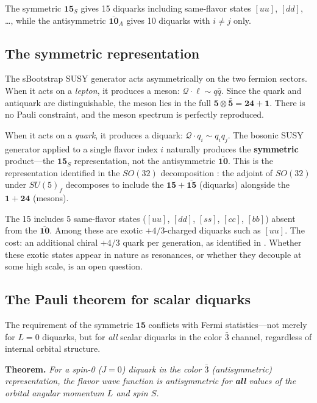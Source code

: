 \documentclass[12pt,a4paper]{article}
\begin{document}
The symmetric $\mathbf{15}_S$ gives 15 diquarks including 
same-flavor states $[uu]$, $[dd]$, \ldots, while the antisymmetric 
$\overline{\mathbf{10}}_A$ gives 10 diquarks with $i \neq j$ only.

\subsection{The symmetric representation}
\label{subsec:sym15}

The sBootstrap SUSY generator acts asymmetrically on the two
fermion sectors. When it acts on a \emph{lepton}, it produces a
meson: $\mathcal{Q} \cdot \ell \sim q\bar{q}$. Since the quark and antiquark 
are distinguishable, the meson lies in the full 
$\mathbf{5} \otimes \bar{\mathbf{5}} = \mathbf{24} + \mathbf{1}$. 
There is no Pauli constraint, and the meson spectrum is perfectly 
reproduced.

When it acts on a \emph{quark}, it produces a diquark:
$\mathcal{Q} \cdot q_i \sim q_i q_j$. The bosonic SUSY generator applied to 
a single flavor index $i$ naturally produces the \textbf{symmetric} 
product---the $\mathbf{15}_S$ representation, not the antisymmetric 
$\overline{\mathbf{10}}$. This is the representation identified 
in the $SO(32)$ decomposition \cite{Rivero2005}: the adjoint of 
$SO(32)$ under $SU(5)_f$ decomposes to include the 
$\mathbf{15} + \overline{\mathbf{15}}$ (diquarks) alongside the 
$\mathbf{1} + \mathbf{24}$ (mesons).

The 15 includes 5 same-flavor states ($[uu]$, $[dd]$, $[ss]$, 
$[cc]$, $[bb]$) absent from the $\overline{\mathbf{10}}$. Among 
these are exotic $+4/3$-charged diquarks such as $[uu]$. The cost: 
an additional chiral $+4/3$ quark per generation, as identified 
in \cite{Rivero2005}. Whether these exotic states appear in nature 
as resonances, or whether they decouple at some high scale, is an 
open question.

\subsection{The Pauli theorem for scalar diquarks}
\label{subsec:pauli}

The requirement of the symmetric $\mathbf{15}$ conflicts with 
Fermi statistics---not merely for $L=0$ diquarks, but for 
\emph{all} scalar diquarks in the color $\bar{3}$ channel, 
regardless of internal orbital structure.

\medskip
\noindent\textbf{Theorem.}
\textit{For a spin-0 ($J=0$) diquark in the color $\bar{3}$ 
(antisymmetric) representation, the flavor wave function is 
antisymmetric for \textbf{all} values of the orbital angular 
momentum $L$ and spin $S$.}
\end{document}
